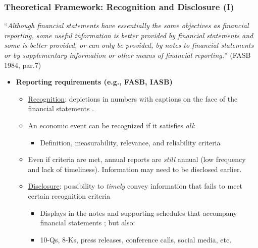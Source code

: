 \documentclass{beamer}
\begin{document}
\begin{frame}
\frametitle{Theoretical Framework: Recognition and Disclosure (I)}
\scriptsize ``\textit{Although financial statements have essentially the same objectives as financial reporting, some useful information is better provided by financial statements and some is better provided, or can only be provided, by notes to financial statements or by supplementary information or other means of financial reporting.}'' (FASB 1984, par.7)  \pause
\medskip

\normalsize
\begin{itemize}
\item \textbf{Reporting requirements (e.g., FASB, IASB)}

	\begin{itemize}
		\item \underline{Recognition}: depictions in numbers with captions on the face of the financial statements \citep{schipperRequiredDisclosuresFinancial2007}. \pause
		\item An economic event can be recognized if it satisfies \textit{all}:
		\begin{itemize}
			\item Definition, measurability, relevance, and reliability criteria

		\end{itemize}
	

	\pause
		\item Even if criteria are met, annual reports are \textit{still} annual (low frequency and lack of timeliness). Information may need to be disclosed earlier. \pause
		\item \underline{Disclosure}: possibility to \textit{timely} convey information that fails to meet certain recognition criteria
	
	\begin{itemize}
		\item Displays in the notes and supporting schedules that accompany financial statements \citep{schipperRequiredDisclosuresFinancial2007}; but also:		
		\item 10-Qs, 8-Ks, press releases, conference calls, social media, etc.
	\end{itemize}	
		
		
	\end{itemize}





\end{itemize}
\end{frame}
\end{document}
